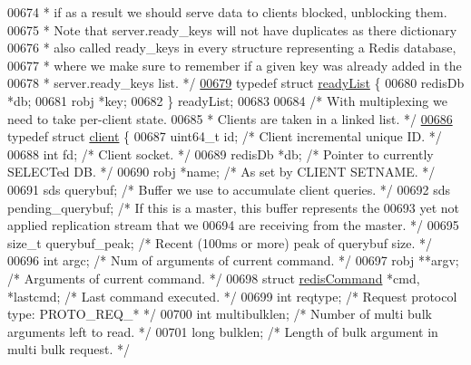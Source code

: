 \begin{DoxyCode}
{{{{{{00674 \textcolor{comment}{ * if as a result we should serve data to clients blocked, unblocking them.}
00675 \textcolor{comment}{ * Note that server.ready\_keys will not have duplicates as there dictionary}
00676 \textcolor{comment}{ * also called ready\_keys in every structure representing a Redis database,}
00677 \textcolor{comment}{ * where we make sure to remember if a given key was already added in the}
00678 \textcolor{comment}{ * server.ready\_keys list. */}
\hyperlink{structreadyList}{00679} \textcolor{keyword}{typedef} \textcolor{keyword}{struct} \hyperlink{structreadyList}{readyList} \{
00680     redisDb *db;
00681     robj *key;
00682 \} readyList;
00683 
00684 \textcolor{comment}{/* With multiplexing we need to take per-client state.}
00685 \textcolor{comment}{ * Clients are taken in a linked list. */}
\hyperlink{structclient}{00686} \textcolor{keyword}{typedef} \textcolor{keyword}{struct} \hyperlink{structclient}{client} \{
00687     uint64\_t id;            \textcolor{comment}{/* Client incremental unique ID. */}
00688     \textcolor{keywordtype}{int} fd;                 \textcolor{comment}{/* Client socket. */}
00689     redisDb *db;            \textcolor{comment}{/* Pointer to currently SELECTed DB. */}
00690     robj *name;             \textcolor{comment}{/* As set by CLIENT SETNAME. */}
00691     sds querybuf;           \textcolor{comment}{/* Buffer we use to accumulate client queries. */}
00692     sds pending\_querybuf;   \textcolor{comment}{/* If this is a master, this buffer represents the}
00693 \textcolor{comment}{                               yet not applied replication stream that we}
00694 \textcolor{comment}{                               are receiving from the master. */}
00695     size\_t querybuf\_peak;   \textcolor{comment}{/* Recent (100ms or more) peak of querybuf size. */}
00696     \textcolor{keywordtype}{int} argc;               \textcolor{comment}{/* Num of arguments of current command. */}
00697     robj **argv;            \textcolor{comment}{/* Arguments of current command. */}
00698     \textcolor{keyword}{struct} \hyperlink{structredisCommand}{redisCommand} *cmd, *lastcmd;  \textcolor{comment}{/* Last command executed. */}
00699     \textcolor{keywordtype}{int} reqtype;            \textcolor{comment}{/* Request protocol type: PROTO\_REQ\_* */}
00700     \textcolor{keywordtype}{int} multibulklen;       \textcolor{comment}{/* Number of multi bulk arguments left to read. */}
00701     \textcolor{keywordtype}{long} bulklen;           \textcolor{comment}{/* Length of bulk argument in multi bulk request. */}
}}}}}}
\end{DoxyCode}
